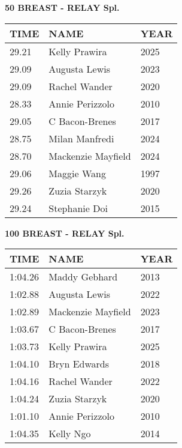 \vspace{0.4cm}

\begin{center}
\begin{minipage}[t]{0.7\textwidth}
\centering
\textbf{50 BREAST - RELAY Spl.}\\[0.05cm]
\begin{tabular}{@{}p{1.8cm}p{2.8cm}p{1.2cm}@{}}
\hline
\textbf{TIME} & \textbf{NAME} & \textbf{YEAR} \\
\hline
29.21 & Kelly Prawira & 2025 \\
29.09 & Augusta Lewis & 2023 \\
29.09 & Rachel Wander & 2020 \\
28.33 & Annie Perizzolo & 2010 \\
29.05 & C Bacon-Brenes & 2017 \\
28.75 & Milan Manfredi & 2024 \\
28.70 & Mackenzie Mayfield & 2024 \\
29.06 & Maggie Wang & 1997 \\
29.26 & Zuzia Starzyk & 2020 \\
29.24 & Stephanie Doi & 2015 \\
\hline
\end{tabular}
\end{minipage}
\end{center}

\vspace{0.4cm}

\begin{center}
\begin{minipage}[t]{0.7\textwidth}
\centering
\textbf{100 BREAST - RELAY Spl.}\\[0.05cm]
\begin{tabular}{@{}p{1.8cm}p{2.8cm}p{1.2cm}@{}}
\hline
\textbf{TIME} & \textbf{NAME} & \textbf{YEAR} \\
\hline
1:04.26 & Maddy Gebhard & 2013 \\
1:02.88 & Augusta Lewis & 2022 \\
1:02.89 & Mackenzie Mayfield & 2023 \\
1:03.67 & C Bacon-Brenes & 2017 \\
1:03.73 & Kelly Prawira & 2025 \\
1:04.10 & Bryn Edwards & 2018 \\
1:04.16 & Rachel Wander & 2022 \\
1:04.24 & Zuzia Starzyk & 2020 \\
1:01.10 & Annie Perizzolo & 2010 \\
1:04.35 & Kelly Ngo & 2014 \\
\hline
\end{tabular}
\end{minipage}
\end{center}

